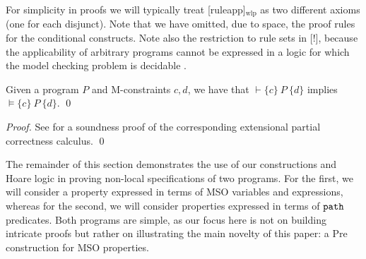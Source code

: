 \documentclass{llncs}
\begin{document}
	 For simplicity in proofs we will typically treat [ruleapp]$_\text{wlp}$ as two different axioms (one for each disjunct). Note that we have omitted, due to space, the proof rules for the conditional constructs. Note also the restriction to rule sets in [!], because the applicability of arbitrary programs cannot be expressed in a logic for which the model checking problem is decidable \cite{Poskitt13a}.
	
	\begin{theorem}[Soundness]\rm
		Given a program $P$ and M-constraints $c,d$, we have that $\vdash \{c\}\ P\ \{d\}$ implies $\models \{c\}\ P\ \{d\}$.
		\qed
	\end{theorem}
	
\begin{proof}
	See \cite{Poskitt13a} for a soundness proof of the corresponding extensional partial correctness calculus.
	\qed
\end{proof}	
	
	
	
	The remainder of this section demonstrates the use of our constructions and Hoare logic in proving non-local specifications of two programs. For the first, we will consider a property expressed in terms of MSO variables and expressions, whereas for the second, we will consider properties expressed in terms of $\tt path$ predicates. Both programs are simple, as our focus here is not on building intricate proofs but rather on illustrating the main novelty of this paper: a Pre construction for MSO properties.
	
\end{document}
